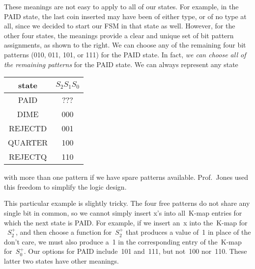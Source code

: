 \begin{minipage}{4.75in}
These meanings are not easy to apply to all of our states.  For example,
in the PAID state, the last coin inserted may have been of either type,
or of no type at all, since we decided to start our FSM in that state as 
well.  However, for the other four states, the meanings provide a clear
and unique set of bit pattern assignments, as shown to the right.  We
can choose any of the remaining four bit patterns (010, 011, 101, or 111)
for the PAID state.  In fact, {\em we can choose all of the remaining
patterns} for the PAID state.  We can always represent any state\linebreak
\end{minipage}\hspace{0.25in}%
\begin{minipage}{1.5in}
\begin{tabular}{cc}
state& $S_2S_1S_0$ \\ \hline
PAID& ???\\
DIME& 000\\
REJECTD& 001\\
QUARTER& 100\\
REJECTQ& 110
\end{tabular}\vspace{12pt}
\end{minipage}\mpdone

with more
than one pattern if we have spare patterns available.  Prof.~Jones
used this freedom to simplify the logic design.

This particular example is slightly tricky.  The four free patterns do
not share any single bit in common, so we cannot simply insert x's
into all~\mbox{K-map} entries for which the next state is PAID.
For example, if we insert an~x into the~\mbox{K-map} for ~$S_2^+$,
and then choose a function for~$S_2^+$ that produces a value of~1
in place of the don't care, we must also produce a~1 in
the corresponding entry of the~\mbox{K-map} for~$S_0^+$.  Our options
for PAID include~101 and~111, but not~100 nor~110.  These latter
two states have other meanings.

